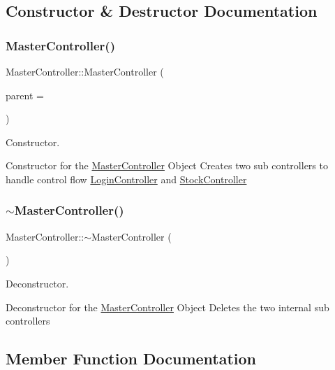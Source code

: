 \subsection{Constructor \& Destructor Documentation}
\mbox{\label{class_master_controller_a4503221125383b917c86863c3e40697b}} 
\subsubsection{\texorpdfstring{Master\+Controller()}{MasterController()}}
{\footnotesize\ttfamily Master\+Controller\+::\+Master\+Controller (\begin{DoxyParamCaption}\item[{Q\+Widget $\ast$}]{parent = {} }\end{DoxyParamCaption})}



Constructor. 

Constructor for the \mbox{\hyperlink{class_master_controller}{Master\+Controller}} Object Creates two sub controllers to handle control flow \mbox{\hyperlink{class_login_controller}{Login\+Controller}} and \mbox{\hyperlink{class_stock_controller}{Stock\+Controller}} \mbox{\label{class_master_controller_a1224d024402d36a61e9bd7b89f434388}} 
\subsubsection{\texorpdfstring{$\sim$\+Master\+Controller()}{~MasterController()}}
{\footnotesize\ttfamily Master\+Controller\+::$\sim$\+Master\+Controller (\begin{DoxyParamCaption}{ }\end{DoxyParamCaption})}



Deconstructor. 

Deconstructor for the \mbox{\hyperlink{class_master_controller}{Master\+Controller}} Object Deletes the two internal sub controllers 

\subsection{Member Function Documentation}
\mbox{\label{class_master_controller_adb9bf0a49dd9010217c47834a98ec184}} 
